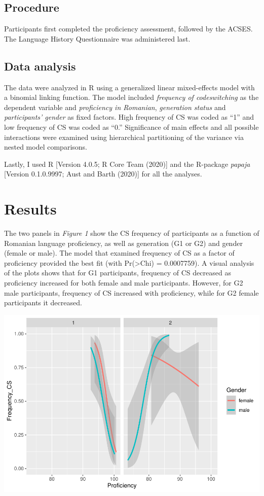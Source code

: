 \documentclass[
  english,
  man]{apa6}
\begin{document}
\hypertarget{procedure}{%
\subsection{Procedure}\label{procedure}}

Participants first completed the proficiency assessment, followed by the ACSES. The Language History Questionnaire was administered last.

\hypertarget{data-analysis}{%
\subsection{Data analysis}\label{data-analysis}}

The data were analyzed in R using a generalized linear mixed-effects model with a binomial linking function. The model included \emph{frequency of codeswitching} as the dependent variable and \emph{proficiency in Romanian}, \emph{generation status} and \emph{participants' gender} as fixed factors. High frequency of CS was coded as ``1'' and low frequency of CS was coded as ``0.'' Significance of main effects and all possible interactions were examined using hierarchical partitioning of the variance via nested model comparisons.

Lastly, I used R {[}Version 4.0.5; R Core Team (2020){]} and the R-package \emph{papaja} {[}Version 0.1.0.9997; Aust and Barth (2020){]} for all the analyses.

\hypertarget{results}{%
\section{Results}\label{results}}

The two panels in \emph{Figure 1} show the CS frequency of participants as a function of Romanian language proficiency, as well as generation (G1 or G2) and gender (female or male).
The model that examined frequency of CS as a factor of proficiency provided the best fit (with Pr(\textgreater Chi) = 0.0007759).
A visual analysis of the plots shows that for G1 participants, frequency of CS decreased as proficiency increased for both female and male participants. However, for G2 male participants, frequency of CS increased with proficiency, while for G2 female participants it decreased.

\includegraphics{Manuscript_files/figure-latex/unnamed-chunk-2-1.pdf}
\end{document}
